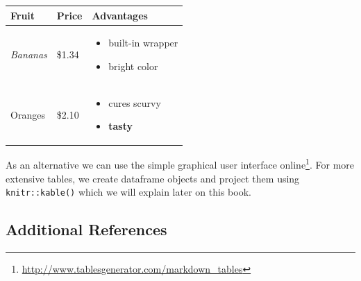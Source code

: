 \documentclass[12pt,]{krantz}
\providecommand{\tightlist}{%
  \setlength{\itemsep}{0pt}\setlength{\parskip}{0pt}}
\renewcommand{\href}[2]{#2\footnote{\url{#1}}}
\begin{document}
\begin{longtable}[]{@{}lll@{}}
\toprule
\begin{minipage}[b]{0.20\columnwidth}\raggedright\strut
Fruit\strut
\end{minipage} & \begin{minipage}[b]{0.20\columnwidth}\raggedright\strut
Price\strut
\end{minipage} & \begin{minipage}[b]{0.27\columnwidth}\raggedright\strut
Advantages\strut
\end{minipage}\tabularnewline
\midrule
\endhead
\begin{minipage}[t]{0.32\columnwidth}\raggedright\strut
\emph{Bananas}\strut
\end{minipage} & \begin{minipage}[t]{0.32\columnwidth}\raggedright\strut
\$1.34\strut
\end{minipage} & \begin{minipage}[t]{0.32\columnwidth}\raggedright\strut
\begin{itemize}
\tightlist
\item
  built-in wrapper
\item
  bright color
\end{itemize}\strut
\end{minipage}\tabularnewline
\begin{minipage}[t]{0.32\columnwidth}\raggedright\strut
Oranges\strut
\end{minipage} & \begin{minipage}[t]{0.32\columnwidth}\raggedright\strut
\$2.10\strut
\end{minipage} & \begin{minipage}[t]{0.32\columnwidth}\raggedright\strut
\begin{itemize}
\tightlist
\item
  cures scurvy
\item
  \textbf{tasty}
\end{itemize}\strut
\end{minipage}\tabularnewline
\bottomrule
\end{longtable}

As an alternative we can use the simple graphical user interface
\href{http://www.tablesgenerator.com/markdown_tables}{online}. For more
extensive tables, we create dataframe objects and project them using
\texttt{knitr::kable()} which we will explain later on this book.

\subsection{Additional References}\label{additional-references-1}
\end{document}
